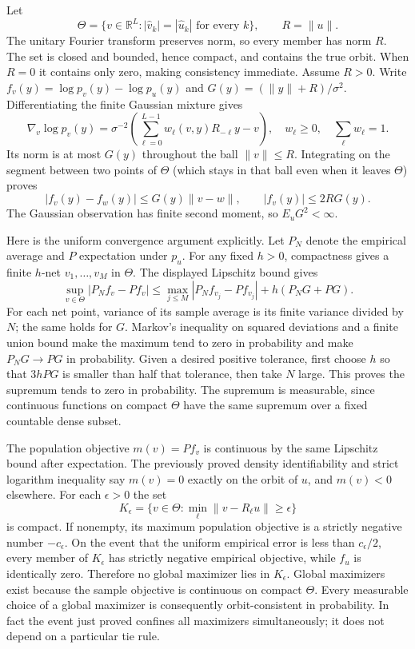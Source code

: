 \documentclass[11pt]{article}
\begin{document}
Let
\[
 \Theta=\{v\in\mathbb R^L: |\widehat v_k|=|\widehat u_k|
                  \text{ for every }k\},\qquad R=\|u\|.
\]
The unitary Fourier transform preserves norm, so every member has norm $R$.
The set is closed and bounded, hence compact, and contains the true orbit.
When $R=0$ it contains only zero, making consistency immediate. Assume $R>0$.
Write $f_v(y)=\log p_v(y)-\log p_u(y)$ and
$G(y)=(\|y\|+R)/\sigma^2$. Differentiating the finite Gaussian mixture gives
\[
 \nabla_v\log p_v(y)
  =\sigma^{-2}\left(\sum_{\ell=0}^{L-1}
            w_\ell(v,y)R_{-\ell}y-v\right),
 \quad w_\ell\ge0,\quad\sum_\ell w_\ell=1.
\]
Its norm is at most $G(y)$ throughout the ball $\|v\|\le R$.
Integrating on the segment between two points of $\Theta$ (which stays in that
ball even when it leaves $\Theta$) proves
\[
 |f_v(y)-f_w(y)|\le G(y)\|v-w\|,\qquad
 |f_v(y)|\le2RG(y).
\]
The Gaussian observation has finite second moment, so $E_uG^2<\infty$.

Here is the uniform convergence argument explicitly. Let $P_N$ denote the
empirical average and $P$ expectation under $p_u$. For any fixed $h>0$,
compactness gives a finite $h$-net $v_1,\ldots,v_M$ in $\Theta$. The displayed
Lipschitz bound gives
\[
 \sup_{v\in\Theta}|P_Nf_v-Pf_v|
 \le\max_{j\le M}|P_Nf_{v_j}-Pf_{v_j}|+h(P_NG+PG).
\]
For each net point, variance of its sample average is its finite variance
divided by $N$; the same holds for $G$. Markov's inequality on squared
deviations and a finite union bound make the maximum tend to zero in probability
and make $P_NG\to PG$ in probability. Given a desired positive tolerance,
first choose $h$ so that $3hPG$ is smaller than half that tolerance, then
take $N$ large. This proves the supremum tends to zero in probability.
The supremum is measurable, since continuous functions on compact $\Theta$
have the same supremum over a fixed countable dense subset.

The population objective $m(v)=Pf_v$ is continuous by the same Lipschitz
bound after expectation. The previously proved density identifiability and
strict logarithm inequality say $m(v)=0$ exactly on the orbit of $u$, and
$m(v)<0$ elsewhere. For each $\epsilon>0$ the set
\[
 K_\epsilon=\{v\in\Theta:\min_\ell\|v-R_\ell u\|\ge\epsilon\}
\]
is compact. If nonempty, its maximum population objective is a strictly
negative number $-c_\epsilon$. On the event that the uniform empirical error
is less than $c_\epsilon/2$, every member of $K_\epsilon$ has strictly
negative empirical objective, while $f_u$ is identically zero. Therefore no
global maximizer lies in $K_\epsilon$. Global maximizers exist because the
sample objective is continuous on compact $\Theta$. Every measurable choice
of a global maximizer is consequently orbit-consistent in probability. In
fact the event just proved confines all maximizers simultaneously; it does
not depend on a particular tie rule.
\end{document}
